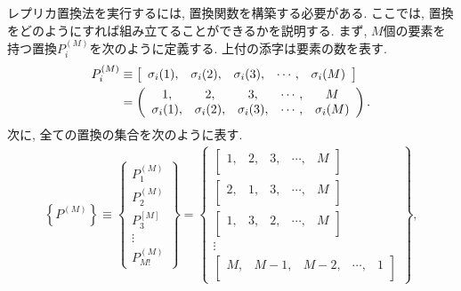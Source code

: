 レプリカ置換法を実行するには, 置換関数を構築する必要がある. 
ここでは, 置換をどのようにすれば組み立てることができるかを説明する. 
まず, $M$個の要素を持つ置換$P_{i}^{(M)}$を次のように定義する. 
上付の添字は要素の数を表す. 
\begin{align}
 P_{i}^{(M)}
&\equiv
 \left[
 \begin{array}{ccccc}
  \sigma_{i}(1), & \sigma_{i}(2), & \sigma_{i}(3), & \cdots, & \sigma_{i}(M) \\
 \end{array}
 \right]
 \notag
 \\
&=
 \left(
 \begin{array}{ccccc}
  1,             & 2,             & 3,             & \cdots, & M             \\
  \sigma_{i}(1), & \sigma_{i}(2), & \sigma_{i}(3), & \cdots, & \sigma_{i}(M) \\
 \end{array}
 \right).
 \label{Eq:Permutation-Function}
\end{align}
次に, 全ての置換の集合を次のように表す. 
\begin{align}
	\left\{P^{(M)}\right\}
 	\equiv
	 \left\{
    	\begin{array}{c}
			P_{1}^{(M)} \\ P_{2}^{(M)} \\ P_{3}^{[M]} \\ \vdots \\ P_{M!}^{(M)}
        \end{array}
 	\right\}
	=
 	\left\{
		\begin{array}{c}
		\left[
				\begin{array}{ccccc} 1, & 2,   & 3,   & \cdots, & M \\ \end{array}
		\right] \\
		\left[
				\begin{array}{ccccc} 2, & 1,   & 3,   & \cdots, & M \\ \end{array}
		\right] \\
		\left[
			\begin{array}{ccccc} 1, & 3,   & 2,   & \cdots, & M \\ \end{array}
		\right] \\
		\vdots \\
	  	\left[
			\begin{array}{ccccc} M, & M-1, & M-2, & \cdots, & 1 \\ \end{array}
		\right]
 		\end{array}
 	\right\} ,
\end{align}
